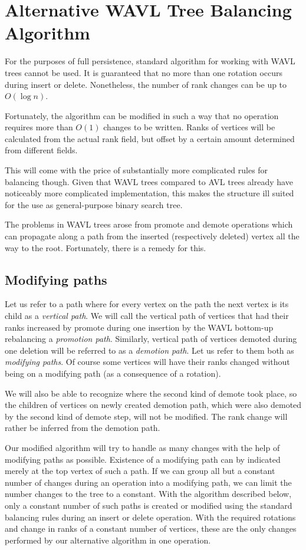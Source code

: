 \section{Alternative WAVL Tree Balancing Algorithm}

For the purposes of full persistence, standard algorithm for working with WAVL trees cannot be used. It is guaranteed that no more than one rotation occurs during insert or delete. Nonetheless, the number of rank changes can be up to $O(\log n)$. 

Fortunately, the algorithm can be modified in such a way that no operation requires more than $O(1)$ changes to be written. Ranks of vertices will be calculated from the actual rank field, but offset by a certain amount determined from different fields. 

This will come with the price of substantially more complicated rules for balancing though. Given that WAVL trees compared to AVL trees already have noticeably more complicated implementation, this makes the structure ill suited for the use as general-purpose binary search tree. 

The problems in WAVL trees arose from promote and demote operations which can propagate along a path from the inserted (respectively deleted) vertex all the way to the root. Fortunately, there is a remedy for this. 

\subsection{Modifying paths}

Let us refer to a path where for every vertex on the path the next vertex is its child as a {\em vertical path}.
We will call the vertical path of vertices that had their ranks increased by promote during one insertion by the WAVL bottom-up rebalancing a {\em promotion path}. 
Similarly, vertical path of vertices demoted during one deletion will be referred to as a {\em demotion path}.
Let us refer to them both as {\em modifying paths}.
Of course some vertices will have their ranks changed without being on a modifying path (as a consequence of a rotation).

We will also be able to recognize where the second kind of demote took place, so the children of vertices on newly created demotion path, which were also demoted by the second kind of demote step, will not be modified. The rank change will rather be inferred from the demotion path. 

Our modified algorithm will try to handle as many changes with the help of modifying paths as possible. Existence of a modifying path can by indicated merely at the top vertex of such a path. If we can group all but a constant number of changes during an operation into a modifying path, we can limit the number changes to the tree to a constant. With the algorithm described below, only a constant number of such paths is created or modified using the standard balancing rules during an insert or delete operation. With the required rotations and change in ranks of a constant number of vertices, these are the only changes performed by our alternative algorithm in one operation.

